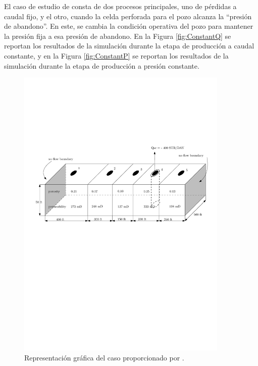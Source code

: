 El caso de estudio de \cite{jamal2006petroleum} consta de dos procesos principales, uno de pérdidas a caudal fijo, y el otro, cuando la celda perforada para el pozo alcanza la ``presión de abandono''. En este, se cambia la condición operativa del pozo para mantener la presión fija a esa presión de abandono. En la Figura \ref{fig:ConstantQ} se reportan los resultados de la simulación durante la etapa de producción a caudal constante, y en la Figura \ref{fig:ConstantP} se reportan los resultados de la simulación durante la etapa de producción a presión constante.
\begin{figure}[h]
	\centering
	\includegraphics[width=0.9\textwidth]{Fig/casoasis.pdf}
	\caption{Representación gráfica del caso proporcionado por \cite{jamal2006petroleum}.}
	\label{fig:Abou-Kassem}
\end{figure}




